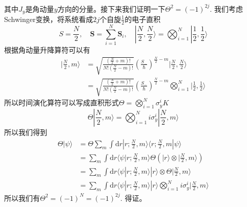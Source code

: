 \documentclass{article}
\numberwithin{equation}{subsection}
\begin{document}
其中$J_y$是角动量$y$方向的分量。接下来我们证明一下$\Theta^2=(-1)^{2j}$. 我们考虑Schwinger变换，将系统看成$2j$个自旋$\frac{1}{2}$的电子直积
\begin{equation}
    S=\frac{N}{2},\quad\mathbf{S}=\sum_{i=1}^{N}\mathbf{S}_i,\quad|\frac{N}{2},\frac{N}{2}\rangle=\bigotimes_{i=1}^{N}|\frac{1}{2},\frac{1}{2}\rangle
\end{equation}
根据角动量升降算符可以有
\begin{equation}
    \begin{split}
        |\frac{N}{2},m\rangle&=\sqrt{\frac{(\frac{N}{2}+m)!}{N!(\frac{N}{2}-m)!}}(\frac{S_-}{\hbar})^{\frac{N}{2}-m}|\frac{N}{2},\frac{N}{2}\rangle\\
        &=\sqrt{\frac{(\frac{N}{2}+m)!}{N!(\frac{N}{2}-m)!}}(\frac{S_-}{\hbar})^{\frac{N}{2}-m}\bigotimes_{i=1}^{N}|\frac{1}{2},\frac{1}{2}\rangle
    \end{split}
\end{equation}
所以时间演化算符可以写成直积形式$\Theta=\bigotimes_{i=1}^{N}\sigma_y^iK$
\begin{equation}
    \Theta|\frac{N}{2},m\rangle=\bigotimes_{i=1}^{N}i\sigma_y^i|\frac{N}{2},m\rangle
\end{equation}
所以我们得到
\begin{equation}
    \begin{split}
        \Theta|\psi\rangle&=\Theta\sum_{m}\int\mathrm{d}r|r;\frac{N}{2},m\rangle\langle r;\frac{N}{2},m|\psi\rangle\\
        &=\sum_{m}\int\mathrm{d}r\langle \psi|r;\frac{N}{2},m\rangle\Theta(|r\rangle\otimes|\frac{N}{2},m\rangle)\\
        &=\sum_{m}\int\mathrm{d}r\langle\psi|r;\frac{N}{2},m\rangle|r\rangle\otimes\Theta|\frac{N}{2},m\rangle\\
        &=\sum_{m}\int\mathrm{d}r\langle\psi|r;\frac{N}{2},m\rangle|r\rangle\bigotimes_{i=1}^{N}i\sigma_y^i|\frac{N}{2},m\rangle
    \end{split}
\end{equation}
所以我们有$\Theta^2=(-1)^N=(-1)^{2j}$. 得证。
\end{document}
